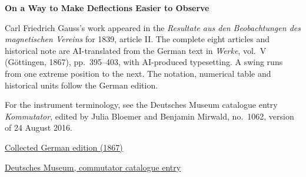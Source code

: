 \clearpage
\thispagestyle{empty}
\begin{center}\Large\textbf{On a Way to Make Deflections Easier to Observe}\end{center}

Carl Friedrich Gauss’s work appeared in the \textit{Resultate aus den Beobachtungen des magnetischen Vereins} for 1839, article II. The complete eight articles and historical note are AI-translated from the German text in \textit{Werke}, vol.~V (Göttingen, 1867), pp.~395--403, with AI-produced typesetting. A swing runs from one extreme position to the next. The notation, numerical table and historical units follow the German edition.

\medskip\noindent
For the instrument terminology, see the Deutsches Museum catalogue entry \textit{Kommutator}, edited by Julia Bloemer and Benjamin Mirwald, no.~1062, version of 24 August 2016.

\medskip\noindent
\href{https://gdz.sub.uni-goettingen.de/id/PPN236006339}{Collected German edition (1867)}\par
\noindent\href{https://digital.deutsches-museum.de/projekte/gruendungssammlung/detail/1062/}{Deutsches Museum, commutator catalogue entry}
\clearpage
